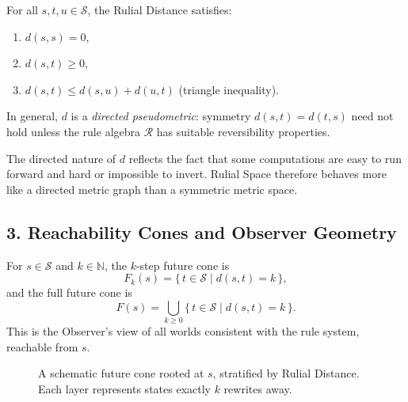 \begin{proposition}
For all $s,t,u \in \mathcal{S}$, the Rulial Distance satisfies:
\begin{enumerate}
    \item $d(s,s) = 0$,
    \item $d(s,t) \ge 0$,
    \item $d(s,t) \le d(s,u) + d(u,t)$ \quad (triangle inequality).
\end{enumerate}
In general, $d$ is a \emph{directed pseudometric}: symmetry $d(s,t) = d(t,s)$ need not hold unless the rule algebra $\mathcal{R}$ has suitable reversibility properties.
\end{proposition}

\begin{remark}
The directed nature of $d$ reflects the fact that some computations are easy to run forward and hard or impossible to invert. Rulial Space therefore behaves more like a directed metric graph than a symmetric metric space.
\end{remark}

\subsection*{3. Reachability Cones and Observer Geometry}

\begin{definition}
For $s \in \mathcal{S}$ and $k \in \mathbb{N}$, the $k$-step future cone is
\[
F_k(s) = \{\, t \in \mathcal{S} \mid d(s,t) = k \,\},
\]
and the full future cone is
\[
F(s) = \bigcup_{k \ge 0} \{\, t \in \mathcal{S} \mid d(s,t) = k \,\}.
\]
This is the Observer's view of all worlds consistent with the rule system, reachable from $s$.
\end{definition}

\begin{figure}[h]
\centering
{}
\caption{A schematic future cone rooted at $s$, stratified by Rulial Distance. Each layer represents states exactly $k$ rewrites away.}
\label{fig:future-cone}
\end{figure}

